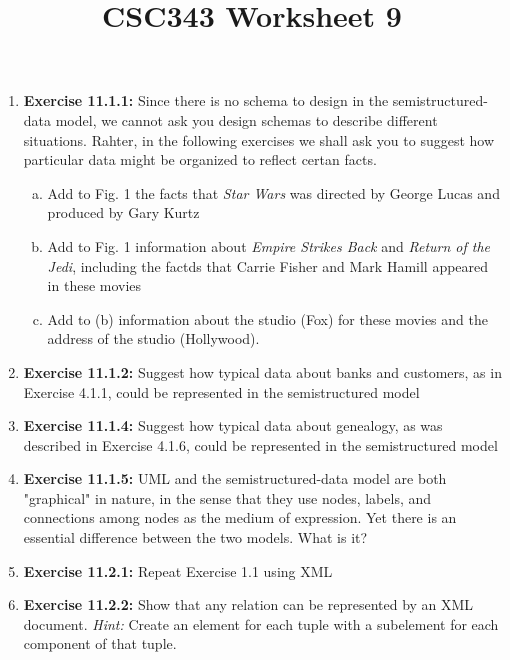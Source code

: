 \documentclass[12pt]{article}
\begin{document}
\title{CSC343 Worksheet 9}
\maketitle

\bigskip

\begin{enumerate}[1.]
    \item \textbf{Exercise 11.1.1:} Since there is no schema to design in the semistructured-data model,
    we cannot ask you design schemas to describe different situations. Rahter,
    in the following exercises we shall ask you to suggest how particular data
    might be organized to reflect certan facts.

    \bigskip

    \begin{enumerate}[a)]
        \item Add to Fig. 1 the facts that \textit{Star Wars} was directed by
        George Lucas and produced by Gary Kurtz
        \item Add to Fig. 1 information about \textit{Empire Strikes Back} and
        \textit{Return of the Jedi}, including the factds that Carrie Fisher and
        Mark Hamill appeared in these movies
        \item Add to (b) information about the studio (Fox) for these movies and
        the address of the studio (Hollywood).
    \end{enumerate}

    \item \textbf{Exercise 11.1.2:} Suggest how typical data about banks and customers,
    as in Exercise 4.1.1, could be represented in the semistructured model

    \item \textbf{Exercise 11.1.4:} Suggest how typical data about genealogy, as was
    described in Exercise 4.1.6, could be represented in the semistructured model

    \item \textbf{Exercise 11.1.5:} UML and the semistructured-data model are both "graphical"
    in nature, in the sense that they use nodes, labels, and connections among
    nodes as the medium of expression. Yet there is an essential difference between
    the two models. What is it?

    \item \textbf{Exercise 11.2.1:} Repeat Exercise 1.1 using XML
    \item \textbf{Exercise 11.2.2:} Show that any relation can be represented by an XML
    document. \textit{Hint:} Create an element for each tuple with a subelement for each
    component of that tuple.


\end{enumerate}
\end{document}
